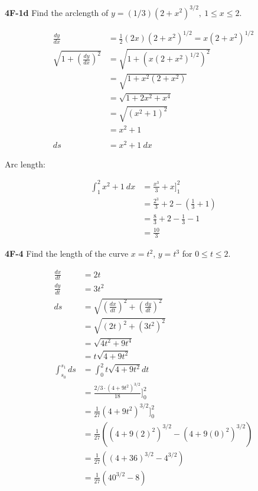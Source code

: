 \documentclass[9pt]{article}
\begin{document}
\begin{tcolorbox}
  \textbf{4F-1d} Find the arclength of $y = (1/3)(2 + x^2)^{3/2},\ 1 \leq x \leq 2$.
\end{tcolorbox}

\begin{align*}
  \frac{dy}{dx} &= \frac{1}{2}(2x)(2 + x^2)^{1/2} = x(2 + x^2)^{1/2} \\
  \sqrt{1 + (\frac{dy}{dx})^2} &= \sqrt{1 + (x(2 + x^2)^{1/2})^2} \\
  &= \sqrt{1 + x^2(2 + x^2)} \\
  &= \sqrt{1 + 2x^2 + x^4} \\
  &= \sqrt{(x^2 + 1)^2} \\
  &= x^2 + 1 \\
\\
  ds &= x^2 + 1\ dx
\end{align*}

Arc length:

\begin{align*}
  \int_{1}^{2} x^2 + 1\ dx &= \frac{x^3}{3} + x \bigg]_{1}^{2} \\
  &= \frac{2^3}{3} + 2 - (\frac{1}{3} + 1) \\
  &= \frac{8}{3} + 2 - \frac{1}{3} - 1 \\
  &= \frac{10}{3}
\end{align*}


\begin{tcolorbox}
  \textbf{4F-4} Find the length of the curve $x = t^2$, $y = t^3$ for $0 \leq t \leq 2$.
\end{tcolorbox}

\begin{align*}
  \frac{dx}{dt} &= 2t \\
  \frac{dy}{dt} &= 3t^2 \\
  ds &= \sqrt{(\frac{dx}{dt})^2 + (\frac{dy}{dt})^2} \\
  &= \sqrt{(2t)^2 + (3t^2)^2} \\
  &= \sqrt{4t^2 + 9t^4} \\
  &= t\sqrt{4 + 9t^2} \\
  \int_{s_0}^{s_1} ds &= \int_{0}^{2} t\sqrt{4 + 9t^2} dt \\
  &= \frac{2/3 \cdot (4 + 9t^2)^{3/2}}{18} \bigg]_{0}^{2} \\
  &= \frac{1}{27} (4 + 9t^2)^{3/2} \bigg]_{0}^{2} \\
  &= \frac{1}{27} ((4 + 9(2)^2)^{3/2} - (4 + 9(0)^2)^{3/2}) \\
  &= \frac{1}{27} ((4 + 36)^{3/2} - 4^{3/2}) \\
  &= \frac{1}{27} (40^{3/2} - 8) \\
\end{align*}
\end{document}
